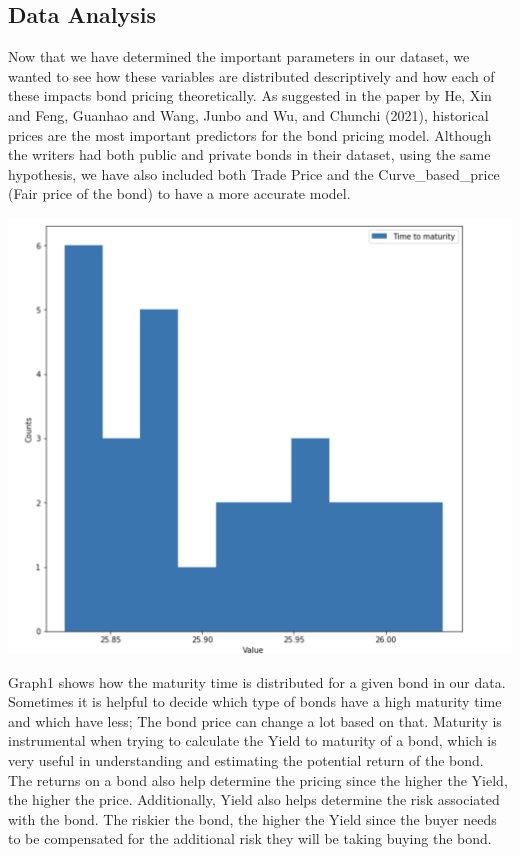 \documentclass[
  man]{apa6}
\begin{document}
\hypertarget{data-analysis}{%
\subsection{Data Analysis}\label{data-analysis}}

Now that we have determined the important parameters in our dataset, we wanted to see how these variables are distributed descriptively and how each of these impacts bond pricing theoretically. As suggested in the paper by He, Xin and Feng, Guanhao and Wang, Junbo and Wu, and Chunchi (2021), historical prices are the most important predictors for the bond pricing model. Although the writers had both public and private bonds in their dataset, using the same hypothesis, we have also included both Trade Price and the Curve\_based\_price (Fair price of the bond) to have a more accurate model.

\par

\includegraphics{graph1.png}

Graph1 shows how the maturity time is distributed for a given bond in our data. Sometimes it is helpful to decide which type of bonds have a high maturity time and which have less; The bond price can change a lot based on that. Maturity is instrumental when trying to calculate the Yield to maturity of a bond, which is very useful in understanding and estimating the potential return of the bond. The returns on a bond also help determine the pricing since the higher the Yield, the higher the price. Additionally, Yield also helps determine the risk associated with the bond. The riskier the bond, the higher the Yield since the buyer needs to be compensated for the additional risk they will be taking buying the bond.
\end{document}
